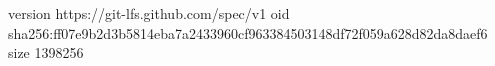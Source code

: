 version https://git-lfs.github.com/spec/v1
oid sha256:ff07e9b2d3b5814eba7a2433960cf963384503148df72f059a628d82da8daef6
size 1398256
